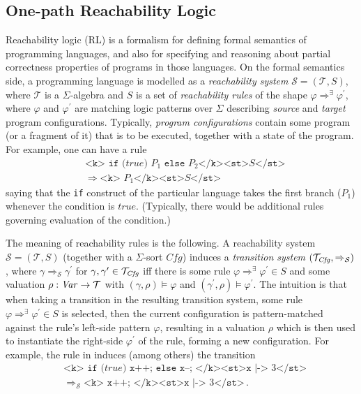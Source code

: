 \subsection{One-path Reachability Logic}
Reachability logic \cite{RosuS12oopsla, StefanescuCMMSR19} (RL) is a formalism for
defining formal semantics of programming languages,
and also for specifying and reasoning about partial correctness properties
of programs in those languages.
On the formal semantics side, a programming language is modelled as a \emph{reachability system}
$\mathcal{S} = (\mathcal{T}, S)$, where $\mathcal{T}$ is a $\Sigma$-algebra
and $S$ is a set of \emph{reachability rules} of the shape $\varphi \Rightarrow^\exists \varphi^\prime$,
where $\varphi$ and $\varphi^\prime$ are matching logic patterns over $\Sigma$
describing \emph{source} and \emph{target} program configurations.
Typically, \emph{program configurations} contain some program (or a fragment of it) that is to be executed,
together with a state of the program.
For example, one can have a rule
\begin{equation}\label{eqn:ruleIfTrue}
    \begin{aligned}
    & \texttt{<k> if (} \mathit{true} \texttt{) }P_1\texttt{ else } P_2 \texttt{</k><st>} S \texttt{</st>} \\
    & \Rightarrow \texttt{<k> }P_1 \texttt{</k><st>} S \texttt{</st>}
    \end{aligned}
\end{equation}
saying that the \texttt{if} construct of the particular language takes the first branch ($P_1$)
whenever the condition is $\mathit{true}$.
(Typically, there would be additional rules governing evaluation of the condition.)

The meaning of reachability rules is the following.
A reachability system $\mathcal{S} = (\mathcal{T}, S)$ (together with a $\Sigma$-sort $\mathit{Cfg}$)
induces
a \emph{transition system}
$(\mathcal{T}_{\mathit{Cfg}} , \Rightarrow_{\mathcal{S}})$,
where $\gamma \Rightarrow_{\mathcal{S}} \gamma^\prime$
for $\gamma, \gamma^\prime \in \mathcal{T}_{\mathit{Cfg}}$
iff there is some rule $\varphi \Rightarrow^\exists \varphi^\prime \in S$
and some valuation $\rho : \mathit{Var} \to \mathcal{T}$ with $(\gamma, \rho) \vDash \varphi$
and $(\gamma^\prime , \rho) \vDash \varphi^\prime$.
The intuition is that when taking a transition in the resulting transition system,
some rule $\varphi \Rightarrow^\exists \varphi^\prime \in S$ is selected,
then the current configuration is pattern-matched against the rule's left-side pattern $\varphi$,
resulting in a valuation $\rho$ which is then used to instantiate the right-side $\varphi^\prime$ of the rule,
forming a new configuration.
For example, the rule in  induces (among others) the transition
\begin{equation}\label{eqn:ruleIfTrue}
    \begin{aligned}
    & \texttt{<k> if (} \mathit{true} \texttt{) x++; else x--; </k><st>x} \texttt{ |-> } 3\texttt{</st>} \\
    & \Rightarrow_{\mathcal{S}} \texttt{<k> x++; </k><st>x} \texttt{ |-> } 3\texttt{</st>} \, .
    \end{aligned}
\end{equation}


